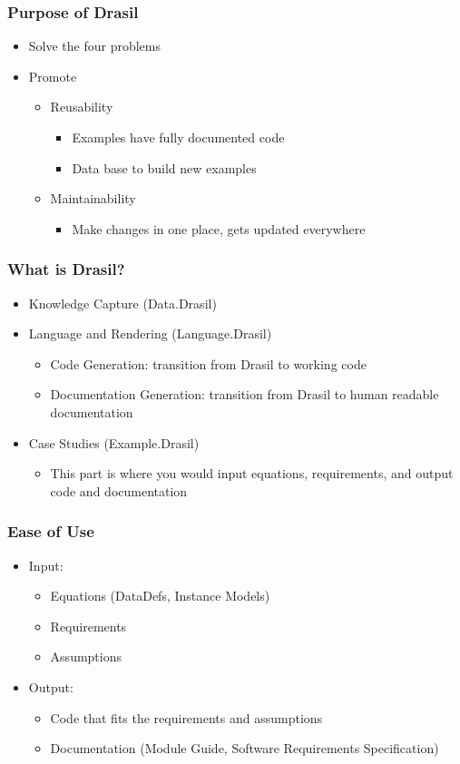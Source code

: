 \documentclass{beamer}
\begin{document}
\begin{frame}
\frametitle{Purpose of Drasil}
\begin{itemize}
 \item Solve the four problems
 \item Promote
  \begin{itemize}
   \item Reusability 
    \begin{itemize}  
     \item Examples have fully documented code
     \item Data base to build new examples
    \end{itemize}
   \item Maintainability 
    \begin{itemize}
     \item Make changes in one place, gets updated everywhere
    \end{itemize}
  \end{itemize}
\end{itemize}
\end{frame}

\begin{frame}
\frametitle{What is Drasil?}
\begin{itemize}
 \item<1-> Knowledge Capture (Data.Drasil)
 \item<2-> Language and Rendering (Language.Drasil)
  \begin{itemize}
   \item Code Generation: transition from Drasil to working code
   \item Documentation Generation: transition from Drasil to human readable documentation
  \end{itemize}
 \item<3-> Case Studies (Example.Drasil)
  \begin{itemize}
   \item This part is where you would input equations, requirements, and output code and documentation
  \end{itemize}
\end{itemize}
\end{frame}

\begin{frame}
\frametitle{Ease of Use}
\begin{itemize}
 \item<1-> Input:
  \begin{itemize}
   \item<2-> Equations (DataDefs, Instance Models)
   \item<3-> Requirements
   \item<4-> Assumptions
  \end{itemize}
 \item<5-> Output:
  \begin{itemize}
   \item<6-> Code that fits the requirements and assumptions
   \item<7-> Documentation (Module Guide, Software Requirements Specification)
  \end{itemize}
\end{itemize}
\end{frame}
\end{document}

